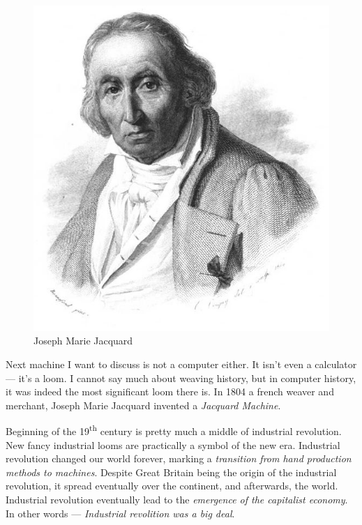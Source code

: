 \documentclass{article}
\begin{document}
            \begin{figure}
                \centering
                \includegraphics[scale=0.2]{images/persons/person_joseph_jacquard.jpg}
                \caption{Joseph Marie Jacquard}
            \end{figure}

            Next machine I want to discuss is not a computer either. It isn't even a calculator --- it's a loom. I cannot say much about weaving history, 
            but in computer history, it was indeed the most significant loom there is. In 1804 a french weaver and merchant, Joseph Marie Jacquard invented a \emph{Jacquard Machine}.

            Beginning of the 19\textsuperscript{th} century is pretty much a middle of industrial revolution. New fancy industrial looms are practically a 
            symbol of the new era. Industrial revolution changed our world forever, marking a \emph{transition from hand production methods to machines}.
            Despite Great Britain being the origin of the industrial revolution, it spread eventually over the continent, and afterwards, the world. 
            Industrial revolution eventually lead to the \emph{emergence of the capitalist economy}. In other words --- \emph{Industrial revolition was a big deal}. \par
\end{document}
